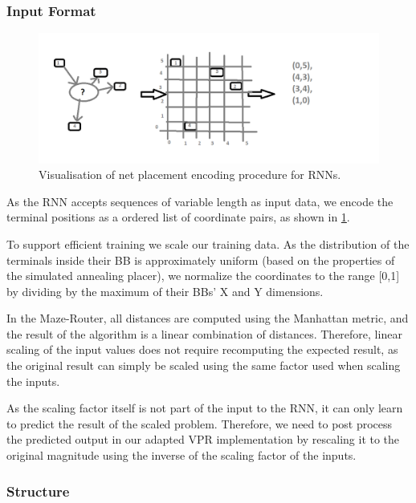 \subsubsection{Input Format}

\begin{figure}
	\includegraphics[width=\linewidth]{plots/rnn-encoding.png}
	\caption{Visualisation of net placement encoding procedure for \glspl{RNN}.}
	\label{fig:rnn-encoding}
\end{figure}

As the \gls{RNN} accepts sequences of variable length as input data, we encode the terminal positions as a ordered list of coordinate pairs, as shown in \ref{fig:rnn-encoding}.

To support efficient training we scale our training data. As the distribution of the terminals inside their \gls{BB} is approximately uniform (based on the properties of the simulated annealing placer), we normalize the coordinates to the range [0,1] by dividing by the maximum of their \glspl{BB}' X and Y dimensions. 

In the Maze-Router, all distances are computed using the Manhattan metric, and the result of the algorithm is a linear combination of distances. Therefore, linear scaling of the input values does not require recomputing the expected result, as the original result can simply be scaled using the same factor used when scaling the inputs.

As the scaling factor itself is not part of the input to the \gls{RNN}, it can only learn to predict the result of the scaled problem. Therefore, we need to post process the predicted output in our adapted \gls{VPR} implementation by rescaling it to the original magnitude using the inverse of the scaling factor of the inputs.

\subsubsection{Structure}\label{ch:rnn-design}



